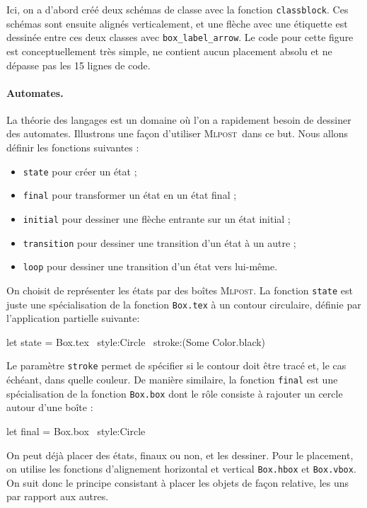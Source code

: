 \documentclass[twoside]{studia-Hermann}
\newcommand{\mlpost}{\textsc{Mlpost}}
\begin{document}
Ici, on a d'abord créé deux schémas de classe avec la fonction
\texttt{classblock}. Ces schémas sont ensuite alignés verticalement,
et une flèche avec une étiquette est dessinée entre ces deux classes
avec \texttt{box\_label\_arrow}. Le code pour cette figure est
conceptuellement très simple, ne contient aucun placement absolu et ne
dépasse pas les 15 lignes de code.

\paragraph{Automates.}\label{sec:automates}
La théorie des langages est un domaine où l'on a  rapidement besoin de
dessiner des automates. Illustrons une façon 
d'utiliser \mlpost\ dans ce but. Nous allons définir les fonctions 
suivantes :
\begin{itemize}
\item \texttt{state} pour créer un état ;
\item \texttt{final} pour transformer un état en un état final ;
\item \texttt{initial} pour dessiner une flèche entrante sur un état initial ;
\item \texttt{transition} pour dessiner une transition d'un état à un autre ;
\item \texttt{loop} pour dessiner une transition d'un état vers lui-même.
\end{itemize}
On choisit de représenter les états par des boîtes \mlpost.  La
fonction \texttt{state} est juste une spé\-ci\-ali\-sa\-tion de la
fonction {\tt Box.tex} à un contour circulaire, définie par
l'application partielle suivante:
\begin{ocaml}
let state = Box.tex ~style:Circle 
                    ~stroke:(Some Color.black)
\end{ocaml}
Le paramètre \texttt{stroke} permet de spécifier si le contour doit
être tracé et, le cas échéant, dans quelle couleur. De manière
similaire, la fonction \texttt{final} est une spécialisation de la
fonction {\tt Box.box} dont le rôle consiste à rajouter un cercle
autour d'une boîte :
\begin{ocaml}
let final = Box.box ~style:Circle
\end{ocaml}

On peut déjà placer des états, finaux ou non,
et  les  dessiner.   Pour  le  placement,  on  utilise  les  fonctions
d'alignement    horizontal    et    vertical   \texttt{Box.hbox}    et
\texttt{Box.vbox}. On  suit donc le  principe consistant à  placer les
objets de façon relative, les uns par rapport aux autres.
\end{document}
